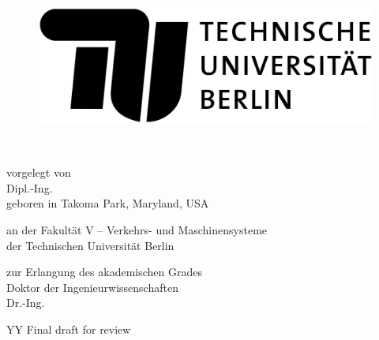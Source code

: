 
\thispagestyle{empty}

\begin{flushright}

	\begin{figure}[!h]
  	\begin{minipage}{1.62\linewidth}
	\begin{center}
	\includegraphics[scale=0.085]{chapters/title/tu-logo-2023.png}
  	\end{center}
  	\end{minipage}
	\end{figure}

	\vspace{20mm}

	\LARGE

	\textbf{\hspace{60mm}\Title} \\[2cm]

	\hrulefill

	\large
	vorgelegt von\\

	Dipl.-Ing. \Autor\\
	geboren in Takoma Park, Maryland, USA\\
	\vspace{10mm}

	an der Fakultät V -- Verkehrs- und Maschinensysteme\\
	der Technischen Universität Berlin

	zur Erlangung des akademischen Grades\\
	Doktor der Ingenieurwissenschaften\\
	Dr.-Ing.\\
	\vspace{5mm}

	YY Final draft for review \\

	\hrulefill


\end{flushright}

